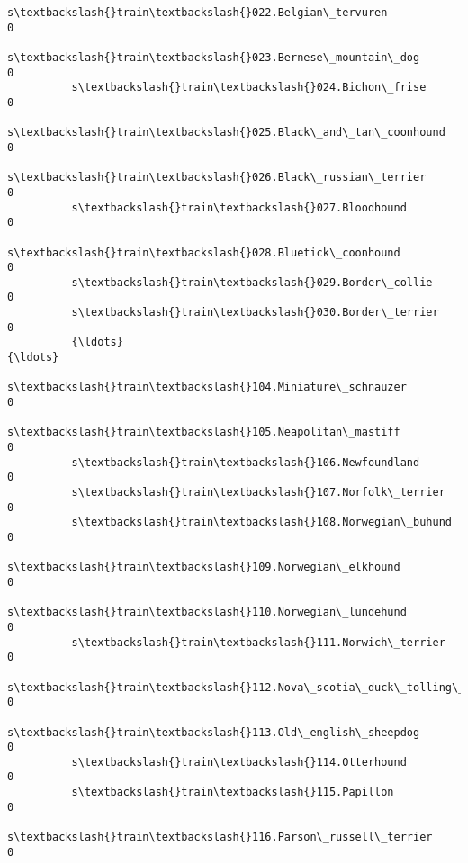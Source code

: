 \documentclass[11pt]{article}
\begin{document}
\begin{Verbatim}[commandchars=\\\{\}]
          s\textbackslash{}train\textbackslash{}022.Belgian\_tervuren                                            0   
          s\textbackslash{}train\textbackslash{}023.Bernese\_mountain\_dog                                        0   
          s\textbackslash{}train\textbackslash{}024.Bichon\_frise                                                0   
          s\textbackslash{}train\textbackslash{}025.Black\_and\_tan\_coonhound                                     0   
          s\textbackslash{}train\textbackslash{}026.Black\_russian\_terrier                                       0   
          s\textbackslash{}train\textbackslash{}027.Bloodhound                                                  0   
          s\textbackslash{}train\textbackslash{}028.Bluetick\_coonhound                                          0   
          s\textbackslash{}train\textbackslash{}029.Border\_collie                                               0   
          s\textbackslash{}train\textbackslash{}030.Border\_terrier                                              0   
          {\ldots}                                                                   {\ldots}   
          s\textbackslash{}train\textbackslash{}104.Miniature\_schnauzer                                         0   
          s\textbackslash{}train\textbackslash{}105.Neapolitan\_mastiff                                          0   
          s\textbackslash{}train\textbackslash{}106.Newfoundland                                                0   
          s\textbackslash{}train\textbackslash{}107.Norfolk\_terrier                                             0   
          s\textbackslash{}train\textbackslash{}108.Norwegian\_buhund                                            0   
          s\textbackslash{}train\textbackslash{}109.Norwegian\_elkhound                                          0   
          s\textbackslash{}train\textbackslash{}110.Norwegian\_lundehund                                         0   
          s\textbackslash{}train\textbackslash{}111.Norwich\_terrier                                             0   
          s\textbackslash{}train\textbackslash{}112.Nova\_scotia\_duck\_tolling\_retriever                          0   
          s\textbackslash{}train\textbackslash{}113.Old\_english\_sheepdog                                        0   
          s\textbackslash{}train\textbackslash{}114.Otterhound                                                  0   
          s\textbackslash{}train\textbackslash{}115.Papillon                                                    0   
          s\textbackslash{}train\textbackslash{}116.Parson\_russell\_terrier                                      0   

\end{Verbatim}
\end{document}
